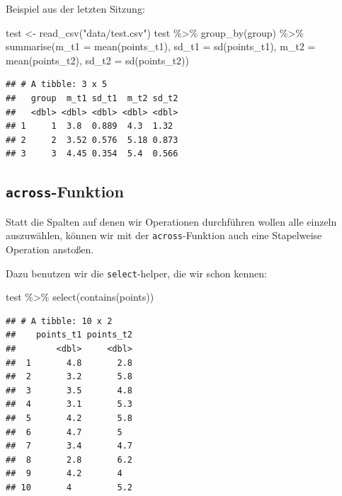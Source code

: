 \documentclass[
]{book}
\newenvironment{Shaded}{\begin{snugshade}}{\end{snugshade}}
\newcommand{\AttributeTok}[1]{\textcolor[rgb]{0.77,0.63,0.00}{#1}}
\newcommand{\FunctionTok}[1]{\textcolor[rgb]{0.00,0.00,0.00}{#1}}
\newcommand{\NormalTok}[1]{#1}
\newcommand{\OtherTok}[1]{\textcolor[rgb]{0.56,0.35,0.01}{#1}}
\newcommand{\SpecialCharTok}[1]{\textcolor[rgb]{0.00,0.00,0.00}{#1}}
\newcommand{\StringTok}[1]{\textcolor[rgb]{0.31,0.60,0.02}{#1}}
\begin{document}
Beispiel aus der letzten Sitzung:

\begin{Shaded}
\begin{Highlighting}[]
\NormalTok{test }\OtherTok{\textless{}{-}} \FunctionTok{read\_csv}\NormalTok{(}\StringTok{"data/test.csv"}\NormalTok{)}
\NormalTok{test }\SpecialCharTok{\%\textgreater{}\%}
  \FunctionTok{group\_by}\NormalTok{(group) }\SpecialCharTok{\%\textgreater{}\%} 
  \FunctionTok{summarise}\NormalTok{(}\AttributeTok{m\_t1 =} \FunctionTok{mean}\NormalTok{(points\_t1),}
            \AttributeTok{sd\_t1 =} \FunctionTok{sd}\NormalTok{(points\_t1),}
            \AttributeTok{m\_t2 =} \FunctionTok{mean}\NormalTok{(points\_t2),}
            \AttributeTok{sd\_t2 =} \FunctionTok{sd}\NormalTok{(points\_t2))}
\end{Highlighting}
\end{Shaded}

\begin{verbatim}
## # A tibble: 3 x 5
##   group  m_t1 sd_t1  m_t2 sd_t2
##   <dbl> <dbl> <dbl> <dbl> <dbl>
## 1     1  3.8  0.889  4.3  1.32 
## 2     2  3.52 0.576  5.18 0.873
## 3     3  4.45 0.354  5.4  0.566
\end{verbatim}

\hypertarget{across-funktion}{%
\subsection{\texorpdfstring{\texttt{across}-Funktion}{across-Funktion}}\label{across-funktion}}

Statt die Spalten auf denen wir Operationen durchführen wollen alle einzeln auszuwählen, können wir mit der \texttt{across}-Funktion auch eine Stapelweise Operation anstoßen.

Dazu benutzen wir die \texttt{select}-helper, die wir schon kennen:

\begin{Shaded}
\begin{Highlighting}[]
\NormalTok{test }\SpecialCharTok{\%\textgreater{}\%} 
  \FunctionTok{select}\NormalTok{(}\FunctionTok{contains}\NormalTok{(}\StringTok{\textquotesingle{}points\textquotesingle{}}\NormalTok{))}
\end{Highlighting}
\end{Shaded}

\begin{verbatim}
## # A tibble: 10 x 2
##    points_t1 points_t2
##        <dbl>     <dbl>
##  1       4.8       2.8
##  2       3.2       5.8
##  3       3.5       4.8
##  4       3.1       5.3
##  5       4.2       5.8
##  6       4.7       5  
##  7       3.4       4.7
##  8       2.8       6.2
##  9       4.2       4  
## 10       4         5.2
\end{verbatim}
\end{document}
